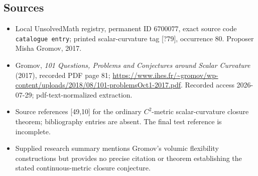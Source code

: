 \documentclass[11pt]{article}
\begin{document}
\subsection{Sources}
\begin{itemize}
\item Local UnsolvedMath registry, permanent ID \(6700077\), exact source code \texttt{catalogue entry}; printed scalar-curvature tag [?79], occurrence 80. Proposer Misha Gromov, 2017.
\item Gromov, \emph{101 Questions, Problems and Conjectures around Scalar Curvature} (2017), recorded PDF page 81; \url{https://www.ihes.fr/~gromov/wp-content/uploads/2018/08/101-problemsOct1-2017.pdf}. Recorded access 2026-07-29; pdf-text-normalized extraction.
\item Source references [49,10] for the ordinary \(C^2\)-metric scalar-curvature closure theorem; bibliography entries are absent. The final test reference is incomplete.
\item Supplied research summary mentions Gromov's volumic flexibility constructions but provides no precise citation or theorem establishing the stated continuous-metric closure conjecture.
\end{itemize}
\end{document}
